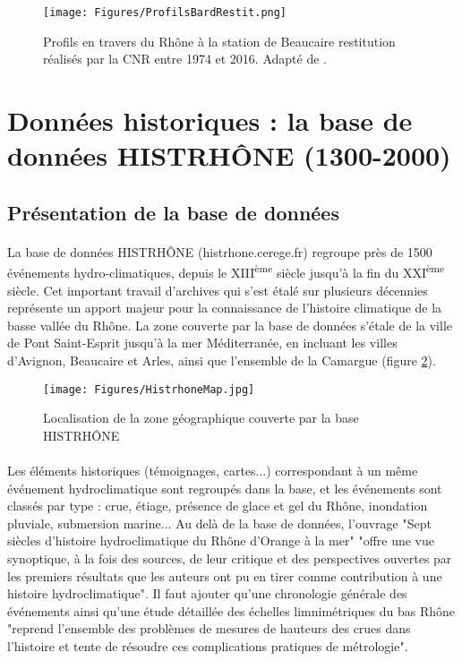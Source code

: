 \documentclass[11pt]{article}
\begin{document}
	\begin{figure}[h]
	\centering
		\texttt{[image: Figures/ProfilsBardRestit.png]}
        \caption{Profils en travers du Rhône à la station de Beaucaire restitution réalisés par la CNR entre 1974 et 2016. Adapté de \cite{bard_actualisation_2018}.}	
		\label{fig:ProfilsRestit}
	\end{figure}
	
       
\FloatBarrier


\section{Données historiques : la base de données HISTRHÔNE (1300-2000)}

	\subsection{Présentation de la base de données}

	\paragraph{} La base de données HISTRHÔNE (histrhone.cerege.fr) \citep{pichard_sept_2014} regroupe près de 1500 événements hydro-climatiques, depuis le XIII\textsuperscript{ème} siècle jusqu'à la fin du XXI\textsuperscript{ème} siècle. Cet important travail d'archives qui s'est étalé sur plusieurs décennies représente un apport majeur pour la connaissance de l'histoire climatique de la basse vallée du Rhône. La zone couverte par la base de données s'étale de la ville de Pont Saint-Esprit jusqu'à la mer Méditerranée, en incluant les villes d'Avignon, Beaucaire et Arles, ainsi que l'ensemble de la Camargue (figure \ref{fig:MapHistrhone}). 
	
	\begin{figure}[h]
	\centering
		\texttt{[image: Figures/HistrhoneMap.jpg]}
        \caption{Localisation de la zone géographique couverte par la base HISTRHÔNE \citep{pichard_sept_2014} }
		\label{fig:MapHistrhone}
	\end{figure}
	
	\paragraph{} Les éléments historiques (témoignages, cartes...) correspondant à un même événement hydroclimatique sont regroupés dans la base, et les événements sont classés par type : crue, étiage, présence de glace et gel du Rhône, inondation pluviale, submersion marine... Au delà de la base de données, l'ouvrage "Sept siècles d'histoire hydroclimatique du Rhône d'Orange à la mer" \cite{pichard_sept_2014} "offre une vue synoptique, à la fois des sources, de leur critique et des perspectives ouvertes par les premiers résultats que les auteurs ont pu en tirer comme contribution à une histoire hydroclimatique". Il faut ajouter qu'une chronologie générale des événements ainsi qu'une étude détaillée des échelles limnimétriques du bas Rhône \citep{pichard_hauteurs_2013} "reprend l'ensemble des problèmes de mesures de hauteurs des crues dans l'histoire et tente de résoudre ces complications pratiques de métrologie".
	
\end{document}
